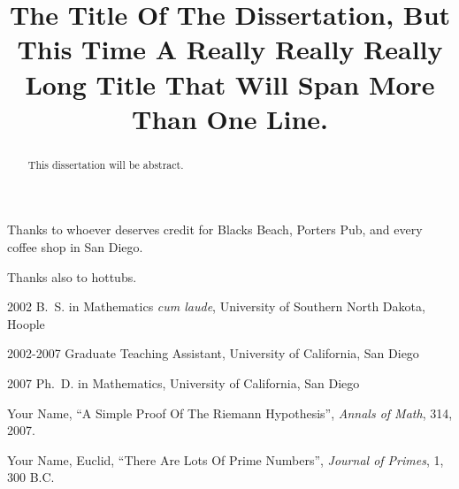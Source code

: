 \begin{frontmatter}
%
\tableofcontents
\listoffigures  %
\listoftables   %



%
%
\begin{acknowledgements} 
 Thanks to whoever deserves credit for Blacks Beach, Porters Pub, and
 every coffee shop in San Diego. 

 Thanks also to hottubs.
\end{acknowledgements}


%
%
\begin{vitapage}
\begin{vita}
  \item[2002] B.~S. in Mathematics \emph{cum laude}, University of Southern North Dakota, Hoople
  \item[2002-2007] Graduate Teaching Assistant, University of California, San Diego
  \item[2007] Ph.~D. in Mathematics, University of California, San Diego 
\end{vita}
\begin{publications}
  \item Your Name, ``A Simple Proof Of The Riemann Hypothesis'', \emph{Annals of Math}, 314, 2007.
  \item Your Name, Euclid, ``There Are Lots Of Prime Numbers'', \emph{Journal of Primes}, 1, 300 B.C.
\end{publications}
\end{vitapage}


%
%
\begin{abstract}
  This dissertation will be abstract. 
\end{abstract}


\end{frontmatter}

%
\title{The Title Of The Dissertation, But This Time A Really Really Really Long Title That Will Span More Than One Line.}

